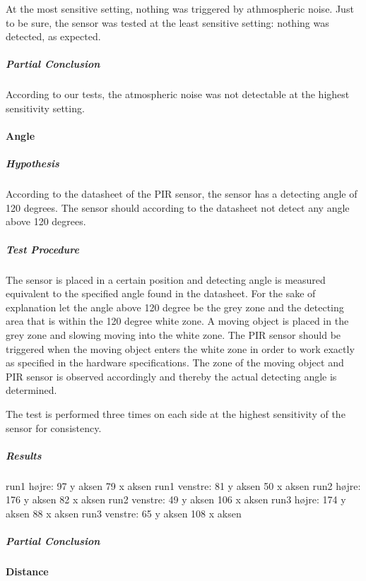 At the most sensitive setting, nothing was triggered by athmospheric noise. Just
to be sure, the sensor was tested at the least sensitive setting: nothing was
detected, as expected.

\subparagraph{Partial Conclusion}
\label{subp:SenPartial Conclusion}

According to our tests, the atmospheric noise was not detectable at the highest
sensitivity setting.

\paragraph{Angle}
\label{par:Angle}

\subparagraph{Hypothesis}
\label{subp:AngHypothesis}
According to the datasheet of the PIR sensor,
the sensor has a detecting angle of 120 degrees.
The sensor should according to the datasheet not detect any angle above 120 degrees.

\subparagraph{Test Procedure}
\label{subp:AngTest Procedure}
The sensor is placed in a certain position and detecting angle is measured equivalent to
the specified angle found in the datasheet.
For the sake of explanation let the angle above 120 degree be the grey zone and
the detecting area that is within the 120 degree white zone.
A moving object is placed in the grey zone and slowing moving into the white zone.
The PIR sensor should be triggered when the moving object enters the white zone in order
to work exactly as specified in the hardware specifications.
The zone of the moving object and PIR sensor is observed accordingly
and thereby the actual detecting angle is determined.

The test is performed three times on each side at the highest sensitivity of the sensor for consistency.

\subparagraph{Results}
\label{subp:AngResults}

run1 højre:
      97 y aksen
      79 x aksen
run1 venstre:
      81 y aksen
      50 x aksen
run2 højre:
      176 y aksen
      82 x aksen
run2 venstre:
      49 y aksen
      106 x aksen
run3 højre:
      174 y aksen
      88 x aksen
run3 venstre:
      65 y aksen
      108 x aksen


\subparagraph{Partial Conclusion}
\label{subp:AngPartial Conclusion}

\paragraph{Distance}

